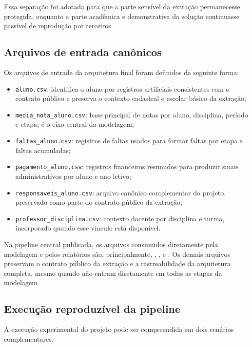 Essa separa\c{c}\~ao foi adotada para que a parte sens\'ivel da extra\c{c}\~ao permanecesse protegida, enquanto a parte acad\^emica e demonstrativa da solu\c{c}\~ao continuasse pass\'ivel de reprodu\c{c}\~ao por terceiros.

\subsection{Arquivos de entrada can\^onicos}

Os arquivos de entrada da arquitetura final foram definidos da seguinte forma:
\begin{itemize}
    \item \texttt{aluno.csv}: identifica o aluno por registros artificiais consistentes com o contrato p\'ublico e preserva o contexto cadastral e escolar b\'asico da extra\c{c}\~ao;
    \item \texttt{media\_nota\_aluno.csv}: base principal de notas por aluno, disciplina, per\'iodo e etapa; \'e o eixo central da modelagem;
    \item \texttt{faltas\_aluno.csv}: registros de faltas usados para formar faltas por etapa e faltas acumuladas;
    \item \texttt{pagamento\_aluno.csv}: registros financeiros resumidos para produzir sinais administrativos por aluno e ano letivo;
    \item \texttt{responsaveis\_aluno.csv}: arquivo can\^onico complementar do projeto, preservado como parte do contrato p\'ublico da extra\c{c}\~ao;
    \item \texttt{professor\_disciplina.csv}: contexto docente por disciplina e turma, incorporado quando esse v\'inculo est\'a dispon\'ivel.
\end{itemize}

Na pipeline central publicada, os arquivos consumidos diretamente pela modelagem e pelos relat\'orios s\~ao, principalmente, , ,  e . Os demais arquivos preservam o contrato p\'ublico da extra\c{c}\~ao e a rastreabilidade da arquitetura completa, mesmo quando n\~ao entram diretamente em todas as etapas da modelagem.

\subsection{Execu\c{c}\~ao reproduz\'ivel da pipeline}

A execu\c{c}\~ao experimental do projeto pode ser compreendida em dois cen\'arios complementares.

